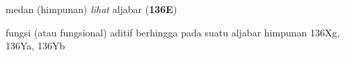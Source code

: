 












medan (himpunan) {\it lihat} aljabar ({\bf 136E})









































fungsi (atau fungsional) aditif berhingga pada suatu aljabar himpunan 136Xg, 136Ya,
136Yb


























































